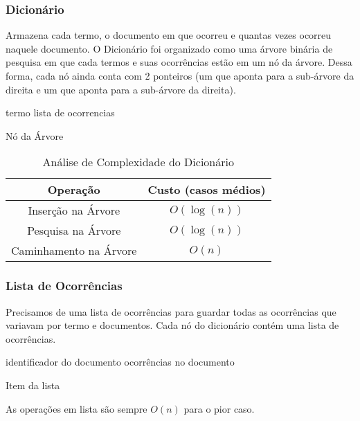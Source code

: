 \documentclass[12pt]{article}
\begin{document}
\subsubsection{Dicionário}
Armazena cada termo, o documento em que ocorreu e quantas
vezes ocorreu naquele documento. O Dicionário foi organizado como uma árvore 
binária de pesquisa em que cada termos e suas ocorrências estão em um nó da 
árvore. Dessa forma, cada nó ainda conta com 2 ponteiros (um que aponta para 
a sub-árvore da direita e um que aponta para a sub-árvore da direita).

\begin{algorithm}[h!]
\begin{footnotesize}
	termo\;
	lista de ocorrencias\;
\caption{Nó da Árvore}
\end{footnotesize}
\end{algorithm}

\begin{table}[ht]
  \caption{Análise de Complexidade do Dicionário}
  \centering
  \begin{footnotesize}
  \begin{tabular}{c c}
  \hline\hline
  Operação & Custo (casos médios) \\
  \hline
  Inserção na Árvore & $O(\log(n))$ \\
  Pesquisa na Árvore & $O(\log(n))$ \\
  Caminhamento na Árvore & $O(n)$ \\
  \hline
  \end{tabular}
  \end{footnotesize}
\end{table}

\subsubsection{Lista de Ocorrências}

Precisamos de uma lista de ocorrências para guardar todas as ocorrências que
variavam por termo e documentos. Cada nó do dicionário contém uma lista de
ocorrências.

\begin{algorithm}[h!]
\begin{footnotesize}
	identificador do documento\;
	ocorrências no documento\;
\caption{Item da lista}
\end{footnotesize}
\end{algorithm}

As operações em lista são sempre $O(n)$ para o pior caso.
\end{document}
